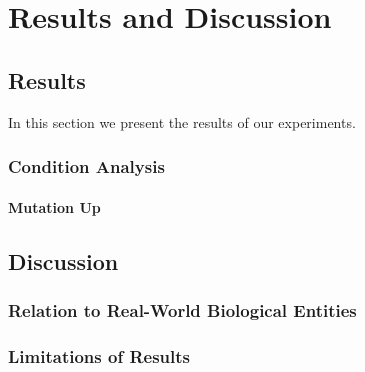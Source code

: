 \chapter{Results and Discussion}\label{ch:results_discussion}


\section{Results}\label{results}
In this section we present the results of our experiments. 

\subsection{Condition Analysis}
\subsubsection{Mutation Up}



\section{Discussion}\label{discussion}

\subsection{Relation to Real-World Biological Entities}

\subsection{Limitations of Results}